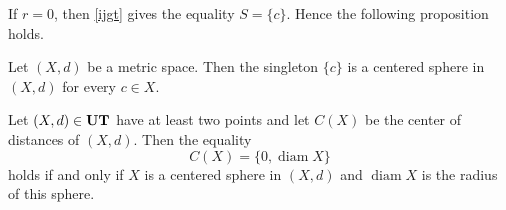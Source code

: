 \documentclass{article}
\begin{document}
If $r=0$, then \eqref{ijgt} gives the equality $S=\{c\}$. Hence the following proposition holds.

\begin{Proposition}\label{sat}
Let $(X,d)$ be a metric space. Then the singleton $\{c\}$ is a centered sphere in $(X,d)$ for every $c\in X$.
\end{Proposition}







\begin{Theorem}\label{shak1}
Let $(X,d)\in {\bf  UT}$ have at least two points and let $C(X)$ be the center of distances of $(X,d)$.
Then the equality
\begin{equation}
    \label{ks1-1}
C(X)=\{0,\operatorname{diam}X\}
\end{equation}
holds if and only if $X$ is a centered sphere in $(X,d)$ and $\operatorname{diam} X$ is the radius of this sphere.
\end{Theorem}
\end{document}
